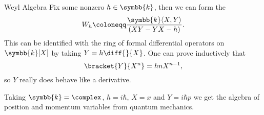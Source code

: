 \documentclass[fleqn]{NotesClass}
\renewcommand{\field}{\symbb{k}}
\begin{document}
    \begin{exm}{Weyl Algebra}{}
        Fix some nonzero \(h \in \field\), then we can form the 
        \begin{equation}
            W_h \coloneqq \frac{\field\langle X, Y \rangle}{(XY - YX - h)}.
        \end{equation}
        This can be identified with the ring of formal differential operators on \(\field[X]\) by taking \(Y = h\diff{}{X}\).
        One can prove inductively that
        \begin{equation}
            \bracket{Y}{X^n} = h n X^{n-1},
        \end{equation}
        so \(Y\) really does behave like a derivative.
        
        Taking \(\field = \complex\), \(h = i \hbar\), \(X = x\) and \(Y = i\hbar p\) we get the algebra of position and momentum variables from quantum mechanics.
    \end{exm}
    
\end{document}
